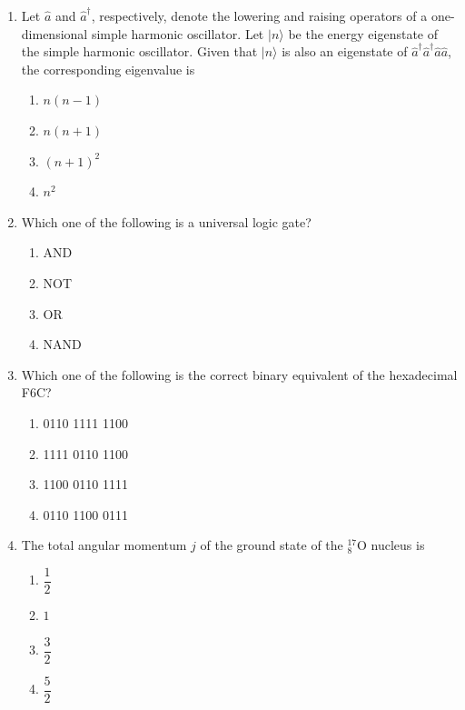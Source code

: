 \documentclass[journal,12pt,onecolumn]{IEEEtran}
\theoremstyle{remark}
\begin{document}
\begin{enumerate}
    \item Let $\hat{a}$ and $\hat{a}^\dagger$, respectively, denote the lowering and raising operators of a one-dimensional simple harmonic oscillator. Let $|n\rangle$ be the energy eigenstate of the simple harmonic oscillator. Given that $|n\rangle$ is also an eigenstate of $\hat{a}^\dagger \hat{a}^\dagger \hat{a} \hat{a}$, the corresponding eigenvalue is
    
    \begin{enumerate}
        \item $n(n-1)$
        \item $n(n+1)$
        \item $(n+1)^2$
        \item $n^2$
    \end{enumerate}
    

    \item Which one of the following is a universal logic gate?
   
    \begin{enumerate}
        \item AND
        \item NOT
        \item OR
        \item NAND
    \end{enumerate}
    

    \item Which one of the following is the correct binary equivalent of the hexadecimal F6C?
    
    \begin{enumerate}
        \item 0110 1111 1100
        \item 1111 0110 1100
        \item 1100 0110 1111
        \item 0110 1100 0111
    \end{enumerate}
    

    \item The total angular momentum $j$ of the ground state of the ${}^{17}_{8}$O nucleus is
    
    \begin{enumerate}
        \item $\dfrac{1}{2}$
        \item $1$
        \item $\dfrac{3}{2}$
        \item $\dfrac{5}{2}$
    \end{enumerate}
    

\end{enumerate}
\end{document}
